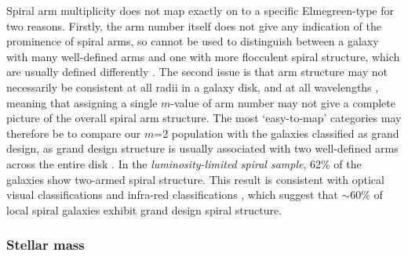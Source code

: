 \documentclass[useAMS,usenatbib]{mn2e}
\begin{document}
Spiral arm multiplicity does not map exactly on to a specific Elmegreen-type for two reasons. Firstly, the arm number itself does not give any indication of the prominence of spiral arms, so cannot be used to distinguish between a galaxy with many well-defined arms and one with more flocculent spiral structure, which are usually defined differently \citep{EE_82,EE_87}. The second issue is that arm structure may not necessarily be consistent at all radii \citep{Grosbol_04} in a galaxy disk, and at all wavelengths \citep{Block_91,Block_94,Thornley_96}, meaning that assigning a single $m$-value of arm number may not give a complete picture of the overall spiral arm structure. The most `easy-to-map' categories may therefore be to compare our $m$=2 population with the galaxies classified as grand design, as grand design structure is usually associated with two well-defined arms across the entire disk \citep{EE_82}. In the \textit{luminosity-limited spiral sample}, 62\% of the galaxies show two-armed spiral structure. This result is consistent with optical visual classifications \citep{EE_82} and infra-red classifications \citep{Grosbol_04}, which suggest that $\sim 60\%$ of local spiral galaxies exhibit grand design spiral structure. 

\subsubsection{Stellar mass}
\label{sec:mass}
\end{document}
